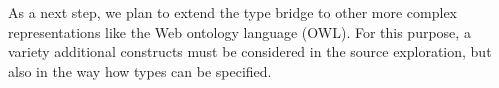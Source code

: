 \documentclass{llncs} %
\newcommand{\fs}{\textsf{F\#}\xspace}
\begin{document}
As a next step, we plan to extend the type bridge to other more complex representations
like the Web ontology language (OWL). For this purpose, a variety additional constructs
must be considered in the source exploration, but also in the way how types can be specified.

%
%
%
%
%
%
%
%
%

\end{document}
